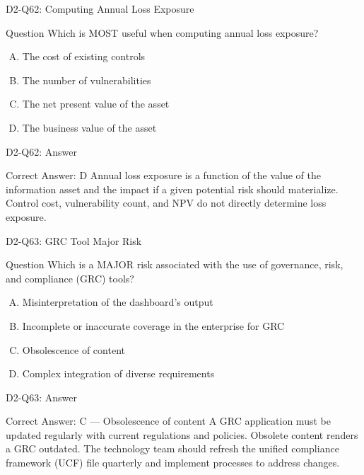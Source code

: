 \documentclass{beamer}
\begin{document}
	\begin{frame}{D2-Q62: Computing Annual Loss Exposure}
		\begin{block}{Question}
			Which is MOST useful when computing annual loss exposure?
		\end{block}
		\begin{enumerate}[(A)]
			\item The cost of existing controls
			\item The number of vulnerabilities
			\item The net present value of the asset
			\item The business value of the asset
		\end{enumerate}
	\end{frame}
	\begin{frame}{D2-Q62: Answer}
		\begin{block}{Correct Answer: D}
			Annual loss exposure is a function of the value of the information asset and the impact if a given potential risk should materialize. Control cost, vulnerability count, and NPV do not directly determine loss exposure.
		\end{block}
	\end{frame}
	
	\begin{frame}{D2-Q63: GRC Tool Major Risk}
		\begin{block}{Question}
			Which is a MAJOR risk associated with the use of governance, risk, and compliance (GRC) tools?
		\end{block}
		\begin{enumerate}[(A)]
			\item Misinterpretation of the dashboard's output
			\item Incomplete or inaccurate coverage in the enterprise for GRC
			\item Obsolescence of content
			\item Complex integration of diverse requirements
		\end{enumerate}
	\end{frame}
	\begin{frame}{D2-Q63: Answer}
		\begin{block}{Correct Answer: C --- Obsolescence of content}
			A GRC application must be updated regularly with current regulations and policies. Obsolete content renders a GRC outdated. The technology team should refresh the unified compliance framework (UCF) file quarterly and implement processes to address changes.
		\end{block}
	\end{frame}
	
\end{document}
